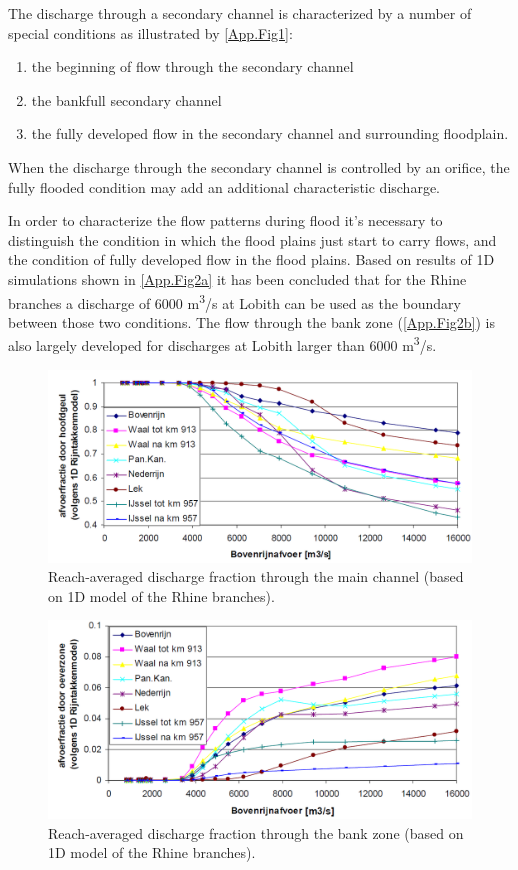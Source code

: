 The discharge through a secondary channel is characterized by a number of special conditions as illustrated by \autoref{App.Fig1}:

\begin{enumerate}
\item the beginning of flow through the secondary channel
\item the bankfull secondary channel
\item the fully developed flow in the secondary channel and surrounding floodplain.
\end{enumerate}

When the discharge through the secondary channel is controlled by an orifice, the fully flooded condition may add an additional characteristic discharge.

In order to characterize the flow patterns during flood it's necessary to distinguish the condition in which the flood plains just start to carry flows, and the condition of fully developed flow in the flood plains.
Based on results of 1D simulations shown in \autoref{App.Fig2a} it has been concluded that for the Rhine branches a discharge of 6000 m\textsuperscript{3}/s at Lobith can be used as the boundary between those two conditions.
The flow through the bank zone (\autoref{App.Fig2b}) is also largely developed for discharges at Lobith larger than
6000 m\textsuperscript{3}/s.

\begin{figure}
\includegraphics[width=\columnwidth]{figures/Fig2a.png}
\caption{Reach-averaged discharge fraction through the main channel (based on 1D model of the Rhine branches).}
\label{App.Fig2a}
\end{figure}

\begin{figure}
\includegraphics[width=\columnwidth]{figures/Fig2b.png}
\caption{Reach-averaged discharge fraction through the bank zone (based on 1D model of the Rhine branches).}
\label{App.Fig2b}
\end{figure}


